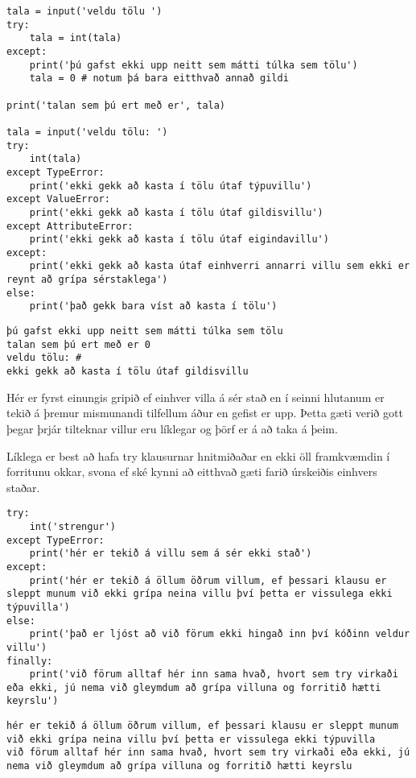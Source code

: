 \begin{lstlisting}[caption=Hvernig á að beita try - except - else, label=lst:villur-grip-kynnt]
tala = input('veldu tölu ')
try:
	tala = int(tala)
except:
	print('þú gafst ekki upp neitt sem mátti túlka sem tölu')
	tala = 0 # notum þá bara eitthvað annað gildi
	
print('talan sem þú ert með er', tala)

tala = input('veldu tölu: ')
try:
	int(tala)
except TypeError:
	print('ekki gekk að kasta í tölu útaf týpuvillu')
except ValueError:
	print('ekki gekk að kasta í tölu útaf gildisvillu')
except AttributeError:
	print('ekki gekk að kasta í tölu útaf eigindavillu')
except:
	print('ekki gekk að kasta útaf einhverri annarri villu sem ekki er reynt að grípa sérstaklega')
else:
	print('það gekk bara víst að kasta í tölu')
\end{lstlisting}
\begin{lstlisting}
þú gafst ekki upp neitt sem mátti túlka sem tölu
talan sem þú ert með er 0
veldu tölu: #
ekki gekk að kasta í tölu útaf gildisvillu
\end{lstlisting}
\lstset{style=venjulegt}

Hér er fyrst einungis gripið ef einhver villa á sér stað en í seinni hlutanum er tekið á þremur mismunandi tilfellum áður en gefist er upp.
Þetta gæti verið gott þegar þrjár tilteknar villur eru líklegar og þörf er á að taka á þeim.

Líklega er best að hafa try klausurnar hnitmiðaðar en ekki öll framkvæmdin í forritunu okkar, svona ef ské kynni að eitthvað gæti farið úrskeiðis einhvers staðar.

\begin{lstlisting}[caption=Hvernig á að beita try - except - else, label=lst:villur-grip-kynnt-2]
try:
	int('strengur')
except TypeError:
	print('hér er tekið á villu sem á sér ekki stað')
except:
	print('hér er tekið á öllum öðrum villum, ef þessari klausu er sleppt munum við ekki grípa neina villu því þetta er vissulega ekki týpuvilla')
else:
	print('það er ljóst að við förum ekki hingað inn því kóðinn veldur villu')
finally:
	print('við förum alltaf hér inn sama hvað, hvort sem try virkaði eða ekki, jú nema við gleymdum að grípa villuna og forritið hætti keyrslu')
\end{lstlisting}
\lstset{style=uttak}
\begin{lstlisting}
hér er tekið á öllum öðrum villum, ef þessari klausu er sleppt munum við ekki grípa neina villu því þetta er vissulega ekki týpuvilla
við förum alltaf hér inn sama hvað, hvort sem try virkaði eða ekki, jú nema við gleymdum að grípa villuna og forritið hætti keyrslu
\end{lstlisting}
\lstset{style=venjulegt}



